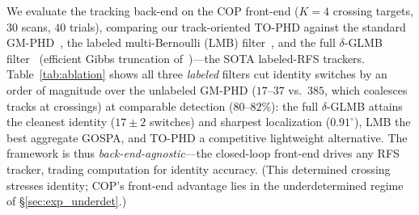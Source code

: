 \documentclass[journal]{IEEEtran}
\begin{document}
We evaluate the tracking back-end on the COP front-end ($K=4$ crossing targets,
$30$ scans, $40$ trials), comparing our track-oriented TO-PHD against the standard
GM-PHD~\cite{vo2006gmphd}, the labeled multi-Bernoulli (LMB)
filter~\cite{vo2014lmb}, and the full $\delta$-GLMB filter~\cite{vo2013glmb}
(efficient Gibbs truncation of~\cite{vo2017efficient})---the SOTA labeled-RFS
trackers. Table~\ref{tab:ablation} shows all three
\emph{labeled} filters cut identity switches by an order of magnitude over the
unlabeled GM-PHD ($17$--$37$ vs.\ $385$, which coalesces tracks at crossings) at
comparable detection ($80$--$82\%$): the full $\delta$-GLMB attains the cleanest
identity ($17\pm2$ switches) and sharpest localization ($0.91^\circ$), LMB the best
aggregate GOSPA, and TO-PHD a competitive lightweight alternative. The framework is
thus \emph{back-end-agnostic}---the closed-loop front-end drives any RFS tracker,
trading computation for identity accuracy. (This determined crossing stresses
identity; COP's front-end advantage lies in the underdetermined regime of
\S\ref{sec:exp_underdet}.)

\begin{table}[t]
\centering
\caption{Tracking back-end ablation on the COP front-end ($K{=}4$ crossing, $40$ trials, $95\%$ CIs). All three labeled filters cut switches by an order of magnitude ($10$--$23\times$) vs.\ GM-PHD; $\delta$-GLMB gives the cleanest identity and sharpest localization, LMB the best aggregate GOSPA.}
\label{tab:ablation}
\small
{}
\end{table}
\end{document}
